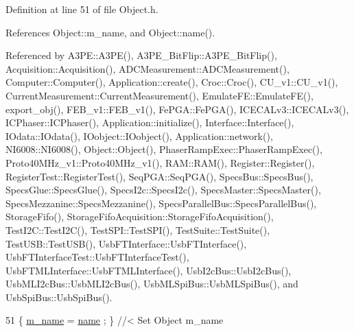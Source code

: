 Definition at line 51 of file Object.\+h.



References Object\+::m\+\_\+name, and Object\+::name().



Referenced by A3\+P\+E\+::\+A3\+P\+E(), A3\+P\+E\+\_\+\+Bit\+Flip\+::\+A3\+P\+E\+\_\+\+Bit\+Flip(), Acquisition\+::\+Acquisition(), A\+D\+C\+Measurement\+::\+A\+D\+C\+Measurement(), Computer\+::\+Computer(), Application\+::create(), Croc\+::\+Croc(), C\+U\+\_\+v1\+::\+C\+U\+\_\+v1(), Current\+Measurement\+::\+Current\+Measurement(), Emulate\+F\+E\+::\+Emulate\+F\+E(), export\+\_\+obj(), F\+E\+B\+\_\+v1\+::\+F\+E\+B\+\_\+v1(), Fe\+P\+G\+A\+::\+Fe\+P\+G\+A(), I\+C\+E\+C\+A\+Lv3\+::\+I\+C\+E\+C\+A\+Lv3(), I\+C\+Phaser\+::\+I\+C\+Phaser(), Application\+::initialize(), Interface\+::\+Interface(), I\+Odata\+::\+I\+Odata(), I\+Oobject\+::\+I\+Oobject(), Application\+::network(), N\+I6008\+::\+N\+I6008(), Object\+::\+Object(), Phaser\+Ramp\+Exec\+::\+Phaser\+Ramp\+Exec(), Proto40\+M\+Hz\+\_\+v1\+::\+Proto40\+M\+Hz\+\_\+v1(), R\+A\+M\+::\+R\+A\+M(), Register\+::\+Register(), Register\+Test\+::\+Register\+Test(), Seq\+P\+G\+A\+::\+Seq\+P\+G\+A(), Specs\+Bus\+::\+Specs\+Bus(), Specs\+Glue\+::\+Specs\+Glue(), Specs\+I2c\+::\+Specs\+I2c(), Specs\+Master\+::\+Specs\+Master(), Specs\+Mezzanine\+::\+Specs\+Mezzanine(), Specs\+Parallel\+Bus\+::\+Specs\+Parallel\+Bus(), Storage\+Fifo(), Storage\+Fifo\+Acquisition\+::\+Storage\+Fifo\+Acquisition(), Test\+I2\+C\+::\+Test\+I2\+C(), Test\+S\+P\+I\+::\+Test\+S\+P\+I(), Test\+Suite\+::\+Test\+Suite(), Test\+U\+S\+B\+::\+Test\+U\+S\+B(), Usb\+F\+T\+Interface\+::\+Usb\+F\+T\+Interface(), Usb\+F\+T\+Interface\+Test\+::\+Usb\+F\+T\+Interface\+Test(), Usb\+F\+T\+M\+L\+Interface\+::\+Usb\+F\+T\+M\+L\+Interface(), Usb\+I2c\+Bus\+::\+Usb\+I2c\+Bus(), Usb\+M\+L\+I2c\+Bus\+::\+Usb\+M\+L\+I2c\+Bus(), Usb\+M\+L\+Spi\+Bus\+::\+Usb\+M\+L\+Spi\+Bus(), and Usb\+Spi\+Bus\+::\+Usb\+Spi\+Bus().


\begin{DoxyCode}
51 \{ \hyperlink{classObject_a8b83c95c705d2c3ba0d081fe1710f48d}{m\_name}  = \hyperlink{classObject_a300f4c05dd468c7bb8b3c968868443c1}{name}  ; \} \textcolor{comment}{//< Set Object m\_name}
\end{DoxyCode}
\mbox{\label{classProcessus_a831b027b9cf18ab56fa6147b5d3055da}} 
